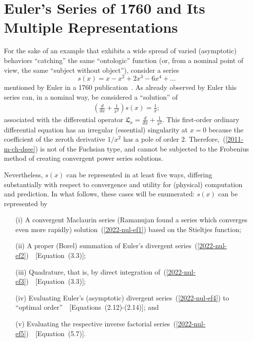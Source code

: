 \documentclass[axioms,article,accept,oneauthor,pdftex]{Definitions/mdpi}
\begin{document}
\section{Euler's Series of 1760 and Its Multiple Representations}

For the sake of an example that exhibits a wide spread of varied (asymptotic) behaviors ``catching''
the same ``ontologic'' function (or, from a nominal point of view, the same ``subject without object''), consider a series
\begin{equation}
s(x)  = x - x^2+2x^3-6x^4 + \ldots
\label{2011-m-ch-dseess}
\end{equation}
mentioned by Euler in a 1760 publication~\cite[\S~6, p.~220]{Euler60}.
As already observed by Euler this series can, in a nominal way, be considered a ``solution'' of
\begin{equation}
\begin{split}
\left(\frac{d}{dx} +\frac{1}{x^2}\right) s(x) = \frac{1}{x};
\end{split}
\label{2011-m-ch-dsee}
\end{equation}
associated with the differential operator $\mathfrak{L}_x = \frac{d}{dx} +\frac{1}{x^2}$.
This first-order ordinary differential equation has an irregular (essential) singularity at $x=0$ because
the coefficient of the zeroth derivative  ${1}/{x^2}$ has a pole of order $2$.
Therefore,~(\ref{2011-m-ch-dsee}) is not of the Fuchsian type, and cannot be subjected to the
Frobenius method of creating convergent power series solutions.

Nevertheless, $s(x)$ can be represented in at least five ways,
differing substantially with respect to convergence and utility for (physical) computation and prediction.
In what follows, these cases will be enumerated: $s(x)$ can be represented by
\begin{itemize}
\item[(i)] A convergent Maclaurin series (Ramanujan found a series which converges even more rapidly) solution~(\ref{2022-nul-ef1}) based on the Stieltjes function;
\item[(ii)] A proper (Borel) summation of Euler's divergent series~(\ref{2022-nul-ef2})~\cite{rousseau-2004}~[Equation~(3.3)];
\item[(iii)] Quadrature, that is, by direct integration of~(\ref{2022-nul-ef3})~\cite{rousseau-2004}~[Equation~(3.3)];
\item[(iv)] Evaluating Euler's (asymptotic) divergent series~(\ref{2022-nul-ef4}) to ``optimal order''~\cite{rousseau-2004}~[Equations~(2.12)-(2.14)]; and
\item[(v)] Evaluating the respective inverse factorial series~(\ref{2022-nul-ef5})~\cite{Weniger2010}~[Equation~(5.7)].
\end{itemize}
\end{document}
